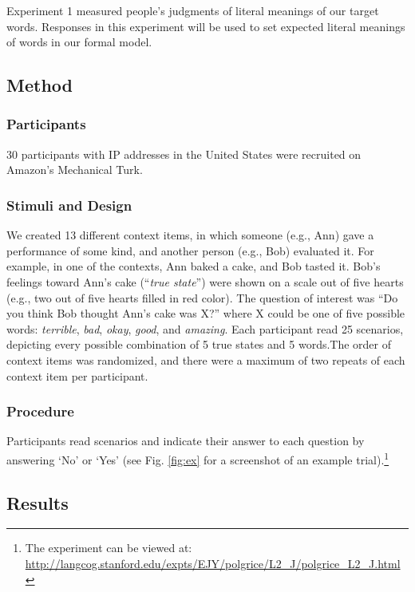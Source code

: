 \documentclass[10pt,letterpaper]{article}
\begin{document}
Experiment 1 measured people's judgments of literal meanings of our target words.
Responses in this experiment will be used to set expected literal meanings of words in our formal model.

\subsection{Method}

\subsubsection{Participants}

30 participants with IP addresses in the United States were recruited on Amazon's Mechanical Turk.

\subsubsection{Stimuli and Design}

We created 13 different context items, in which someone (e.g., Ann) gave a performance of some kind, and another person (e.g., Bob) evaluated it. For example, in one of the contexts, Ann baked a cake, and Bob tasted it. Bob's feelings toward Ann's cake (``\emph{true state}'') were shown on a scale out of five hearts (e.g., two out of five hearts filled in red color). The question of interest was ``Do you think Bob thought Ann's cake was X?'' where X could be one of five possible words: \emph{terrible}, \emph{bad}, \emph{okay}, \emph{good}, and \emph{amazing}. Each participant read 25 scenarios, depicting every possible combination of 5 true states and 5 words.The order of context items was randomized, and there were a maximum of two repeats of each context item per participant.

\subsubsection{Procedure}

Participants read scenarios and indicate their answer to each question by answering `No' or `Yes' (see Fig. \ref{fig:ex} for a screenshot of an example trial).\footnote{The experiment can be viewed at: \url{http://langcog.stanford.edu/expts/EJY/polgrice/L2_J/polgrice_L2_J.html}}

\subsection{Results}
\end{document}
